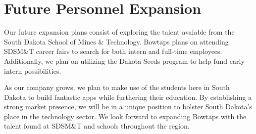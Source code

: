\section{Future Personnel Expansion}
Our future expansion plans consist of exploring the talent avalable from the South Dakota School of Mines \& Technology. Bowtaps plans on attending SDSM\&T career fairs to search for both intern and full-time employees. Additionally, we plan on utilizing the Dakota Seeds program to help fund early intern possibilities.

As our company grows, we plan to make use of the students here in South Dakota to build fantastic apps while furthering their education. By establishing a strong market presence, we will be in a unique position to bolster South Dakota's place in the technology sector. We look forward to expanding Bowtaps with the talent found at SDSM\&T and schools throughout the region.
